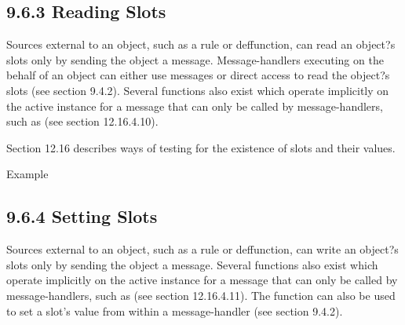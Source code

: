 \documentclass[letterpaper,10pt,english]{sphinxmanual}
\begin{document}
\subsection{9.6.3 Reading Slots}
\label{\detokenize{cool:reading-slots}}
Sources external to an object, such as a rule or deffunction, can read
an object?s slots only by sending the object a message. Message-handlers
executing on the behalf of an object can either use messages or direct
access to read the object?s slots (see section 9.4.2). Several functions
also exist which operate implicitly on the active instance for a message
that can only be called by message-handlers, such as 
(see section 12.16.4.10).

Section 12.16 describes ways of testing for the existence of slots and
their values.

Example

\begin{sphinxVerbatim}[commandchars=\\\{\}]
 
   
   
    
\PYG{p}{[}\PYG{p}{]}
   \PYG{p}{[}\PYG{p}{]}  
\end{sphinxVerbatim}


\subsection{9.6.4 Setting Slots}
\label{\detokenize{cool:setting-slots}}
Sources external to an object, such as a rule or deffunction, can write
an object?s slots only by sending the object a message. Several
functions also exist which operate implicitly on the active instance for
a message that can only be called by message-handlers, such as
 (see section 12.16.4.11). The  function can also
be used to set a slot’s value from within a message-handler (see section
9.4.2).
\end{document}
